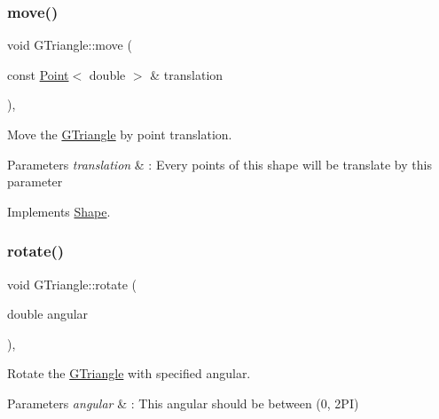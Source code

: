 \mbox{\label{classGTriangle_a6675f3448fca16c1afec576145a9b139}} 
\subsubsection{\texorpdfstring{move()}{move()}}
{\footnotesize\ttfamily void G\+Triangle\+::move (\begin{DoxyParamCaption}\item[{const \hyperlink{classPoint}{Point}$<$ double $>$ \&}]{translation }\end{DoxyParamCaption})\hspace{0.3cm}{\ttfamily [override]}, {\ttfamily [virtual]}}



Move the \hyperlink{classGTriangle}{G\+Triangle} by point translation. 


\begin{DoxyParams}{Parameters}
{\em translation} & \+: Every points of this shape will be translate by this parameter \\
\hline
\end{DoxyParams}


Implements \hyperlink{classShape_a1f447acd6219cb10b9b7a40371519c46}{Shape}.

\mbox{\label{classGTriangle_ae3ed75bbad4ba7fed68bc06c5834cfbe}} 
\subsubsection{\texorpdfstring{rotate()}{rotate()}}
{\footnotesize\ttfamily void G\+Triangle\+::rotate (\begin{DoxyParamCaption}\item[{double}]{angular }\end{DoxyParamCaption})\hspace{0.3cm}{\ttfamily [override]}, {\ttfamily [virtual]}}



Rotate the \hyperlink{classGTriangle}{G\+Triangle} with specified angular. 


\begin{DoxyParams}{Parameters}
{\em angular} & \+: This angular should be between (0, 2\+PI) \\
\hline
\end{DoxyParams}


